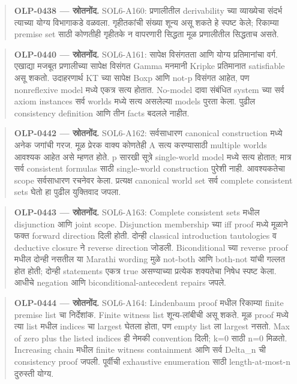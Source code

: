 \begin{quote}\small\textbf{OLP-0438 — स्रोतनोंद.} SOL6-A160: प्रणालीतील derivability च्या व्याख्येचा संदर्भ त्याच्या योग्य विभागाकडे वळवला. गृहीतकांची संख्या शून्य असू शकते हे स्पष्ट केले; रिकाम्या premise set साठी कोणतीही गृहीतके न वापरणारी सिद्धता मूळ प्रणालीतील सिद्धताच असते.\end{quote}
\begin{quote}\small\textbf{OLP-0440 — स्रोतनोंद.} SOL6-A161: सापेक्ष विसंगतता आणि योग्य प्रतिमानांचा वर्ग. एखाद्या मजबूत प्रणालीच्या सापेक्ष विसंगत Gamma मनमानी Kripke प्रतिमानात satisfiable असू शकतो. उदाहरणार्थ KT च्या सापेक्ष Boxp आणि not-p विसंगत आहेत, पण nonreflexive model मध्ये एकत्र सत्य होतात. No-model दावा संबंधित system च्या सर्व axiom instances सर्व worlds मध्ये सत्य असलेल्या models पुरता केला. पुढील consistency definition आणि तीन facts बदलले नाहीत.\end{quote}
\begin{quote}\small\textbf{OLP-0442 — स्रोतनोंद.} SOL6-A162: सर्वसाधारण canonical construction मध्ये अनेक जगांची गरज. मूळ प्रेरक वाक्य कोणतेही A सत्य करण्यासाठी multiple worlds आवश्यक आहेत असे म्हणत होते. p सारखी सूत्रे single-world model मध्ये सत्य होतात; मात्र सर्व consistent formulas साठी single-world construction पुरेशी नाही. आवश्यकतेचा scope सर्वसाधारण रचनेवर केला. प्रत्यक्ष canonical world set सर्व complete consistent sets घेतो हा पुढील युक्तिवाद जपला.\end{quote}
\begin{quote}\small\textbf{OLP-0443 — स्रोतनोंद.} SOL6-A163: Complete consistent sets मधील disjunction आणि joint scope. Disjunction membership च्या iff proof मध्ये मूळाने फक्त forward direction दिली होती. दोन्ही classical introduction tautologies व deductive closure ने reverse direction जोडली. Biconditional च्या reverse proof मधील दोन्ही नसतील या Marathi wording मुळे not-both आणि both-not यांची गल्लत होत होती; दोन्ही statements एकत्र true असण्याच्या प्रत्येक शक्यतेचा निषेध स्पष्ट केला. आधीचे negation आणि biconditional-antecedent repairs जपले.\end{quote}
\begin{quote}\small\textbf{OLP-0444 — स्रोतनोंद.} SOL6-A164: Lindenbaum proof मधील रिकाम्या finite premise list चा निर्देशांक. Finite witness list शून्य-लांबीची असू शकते. मूळ proof मध्ये त्या list मधील indices चा largest घेतला होता, पण empty list ला largest नसतो. Max of zero plus the listed indices ही नेमकी convention दिली; k=0 साठी n=0 मिळतो. Increasing chain मधील finite witness containment आणि सर्व Delta\_n ची consistency proof जपली. पूर्वीची exhaustive enumeration साठी length-at-most-n दुरुस्ती योग्य.\end{quote}
